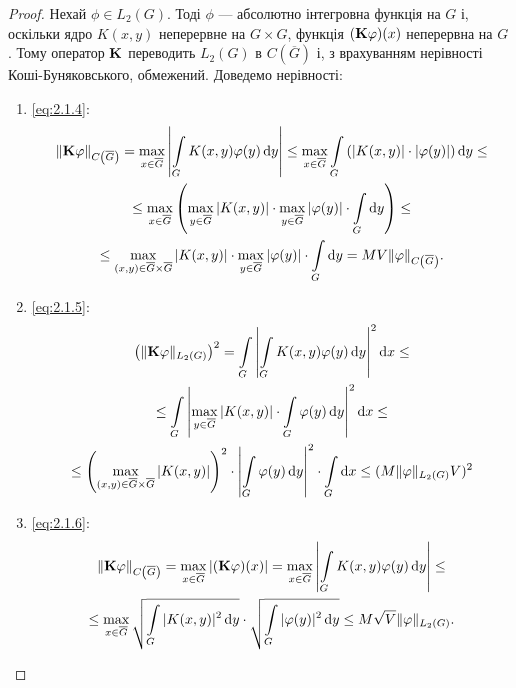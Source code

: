 \begin{proof}
	Нехай $\phi \in L_2(G)$. Тоді $\phi$ --- абсолютно інтегровна функція на $G$ і, оскільки ядро $K(x, y)$ неперервне на $G \times G$, функція $(\bf{K}\phi)(x)$ неперервна на $G$. Тому оператор $\bf{K}$ переводить $L_2(G)$ в $C\left(\overline G\right)$ і, з врахуванням нерівності Коші-Буняковського, обмежений. Доведемо нерівності:
	\begin{enumerate}
		\item \eqref{eq:2.1.4}:
		\begin{multline*}
			\| \bf{K} \phi \|_{C\left(\overline G\right)} = \Max_{x \in \overline G} \left| \Int_G K(x, y) \phi(y) \diff y \right| \le \Max_{x \in \overline G} \Int_G \left( |K(x, y)| \cdot |\phi(y)| \right) \diff y \le \\
			\le \Max_{x \in \overline G} \left( \Max_{y \in \overline G} |K(x, y)| \cdot \Max_{y \in \overline G} |\phi(y)| \cdot \Int_G \diff y \right) \le \\
			\le \Max_{(x, y) \in \overline G \times \overline G} |K(x, y)| \cdot \Max_{y \in \overline G} |\phi(y)| \cdot \Int_G \diff y = M V \|\phi\|_{C\left(\overline G\right)}.
		\end{multline*}
		\item \eqref{eq:2.1.5}:
		\begin{multline*}
			\left( \| \bf{K} \phi \|_{L_2(G)} \right)^2 = \Int_G \left| \Int_G K(x, y) \phi(y) \diff y \right|^2 \diff x \le \\
			\le \Int_G \left| \Max_{y \in \overline G} |K(x, y)| \cdot \Int_G \phi(y) \diff y \right|^2 \diff x \le \\
			\le \left( \Max_{(x, y) \in \overline G \times \overline G} |K(x, y)| \right)^2 \cdot \left| \Int_G \phi(y) \diff y \right|^2 \cdot \Int_G \diff x \le (M \| \phi\|_{L_2(G)} V)^2
		\end{multline*}
		\item \eqref{eq:2.1.6}:
		\begin{multline*}
			\| \bf{K} \phi \|_{C\left(\overline G\right)} = \Max_{x \in \overline G} |(\bf{K} \phi) (x)| = \Max_{x \in \overline G} \left| \Int_G K(x, y) \phi(y) \diff y \right| \le \\
			\le \Max_{x \in \overline G} \sqrt{\Int_G |K(x, y)|^2 \diff y} \cdot \sqrt{\Int_G |\phi(y)|^2 \diff y} \le M \sqrt{V} \|\phi\|_{L_2(G)}.
		\end{multline*}
	\end{enumerate}
\end{proof}


